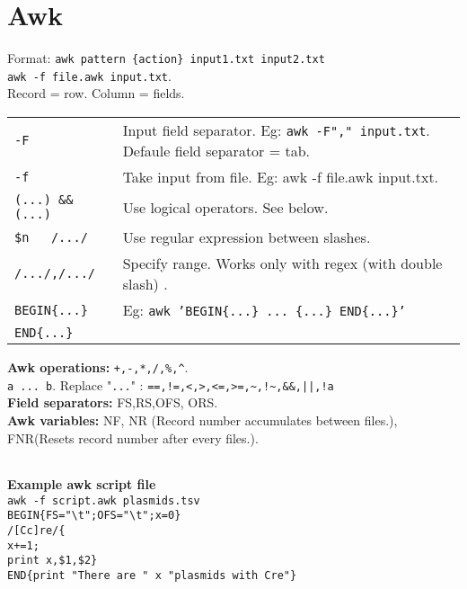 \section{Awk}

Format: \texttt{awk pattern \{action\} input1.txt input2.txt} \\ \texttt{awk -f file.awk input.txt}.\\ Record = row. Column = fields. \\

\begin{tabularx}{\linewidth}{lX}

\texttt{-F} & Input field separator. Eg: \texttt{awk -F"," input.txt}. Defaule field separator = tab.\\
\texttt{-f} & Take input from file. Eg: awk -f file.awk input.txt.\\
\texttt{(...) \&\& (...)} &  Use logical operators. See below.\\
\texttt{\$n ~ /.../} & Use regular expression between slashes.\\
\texttt{/.../,/.../} & Specify range. Works only with regex (with double slash) .\\
\texttt{BEGIN\{...\}} & Eg: \texttt{awk 'BEGIN\{...\} ... \{...\} END\{...\}'}\\
\texttt{END\{...\}} & \\
\hline
\end{tabularx}
\textbf{Awk operations:} \texttt{+,-,*,/,\%,\^{}}. \\
\texttt{a ... b}. Replace "\texttt{...}" : \texttt{==,!=,<,>,<=,>=,\~{},!\~{},\&\&,||,!a}\\
\textbf{Field separators:} FS,RS,OFS, ORS.\\
\textbf{Awk variables:} NF, NR (Record number accumulates between files.), FNR(Resets record number after every files.).\\

\begin{tabularx}{\linewidth}{lX}
\hline
\end{tabularx}

\textbf{Example awk script file}\\
\texttt{awk -f script.awk plasmids.tsv}\\
\texttt{BEGIN\{FS="\textbackslash t";OFS="\textbackslash t";x=0\}}\\
\texttt{/[Cc]re/\{}\\
\texttt{x+=1;}\\
\texttt{print x,\$1,\$2\}}\\
\texttt{END\{print "There are " x "plasmids with Cre"\}}

